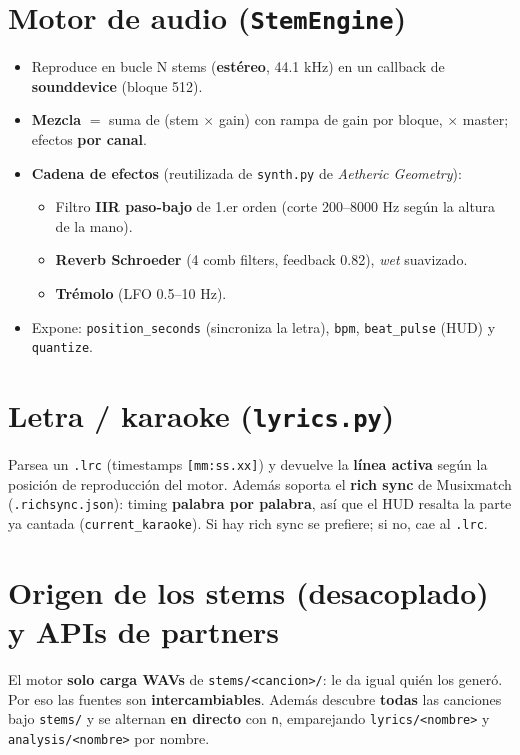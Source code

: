 \documentclass[11pt]{article}
\newcommand{\code}[1]{\texttt{#1}}
\begin{document}
\section{Motor de audio (\texttt{StemEngine})}

\begin{itemize}
  \item Reproduce en bucle N stems (\textbf{estéreo}, 44.1 kHz) en un callback de \textbf{sounddevice} (bloque 512).
  \item \textbf{Mezcla} $=$ suma de (stem $\times$ gain) con rampa de gain por bloque, $\times$ master; efectos \textbf{por canal}.
  \item \textbf{Cadena de efectos} (reutilizada de \code{synth.py} de \emph{Aetheric Geometry}):
  \begin{itemize}
    \item Filtro \textbf{IIR paso-bajo} de 1.er orden (corte 200--8000 Hz según la altura de la mano).
    \item \textbf{Reverb Schroeder} (4 comb filters, feedback 0.82), \emph{wet} suavizado.
    \item \textbf{Trémolo} (LFO 0.5--10 Hz).
  \end{itemize}
  \item Expone: \code{position\_seconds} (sincroniza la letra), \code{bpm}, \code{beat\_pulse} (HUD) y \code{quantize}.
\end{itemize}

\section{Letra / karaoke (\texttt{lyrics.py})}

Parsea un \code{.lrc} (timestamps \code{[mm:ss.xx]}) y devuelve la \textbf{línea activa} según la
posición de reproducción del motor. Además soporta el \textbf{rich sync} de Musixmatch
(\code{.richsync.json}): timing \textbf{palabra por palabra}, así que el HUD resalta la parte ya
cantada (\code{current\_karaoke}). Si hay rich sync se prefiere; si no, cae al \code{.lrc}.

\section{Origen de los stems (desacoplado) y APIs de partners}

El motor \textbf{solo carga WAVs} de \code{stems/<cancion>/}: le da igual quién los generó. Por eso
las fuentes son \textbf{intercambiables}. Además descubre \textbf{todas} las canciones bajo
\code{stems/} y se alternan \textbf{en directo} con \code{n}, emparejando \code{lyrics/<nombre>}
y \code{analysis/<nombre>} por nombre.
\end{document}
